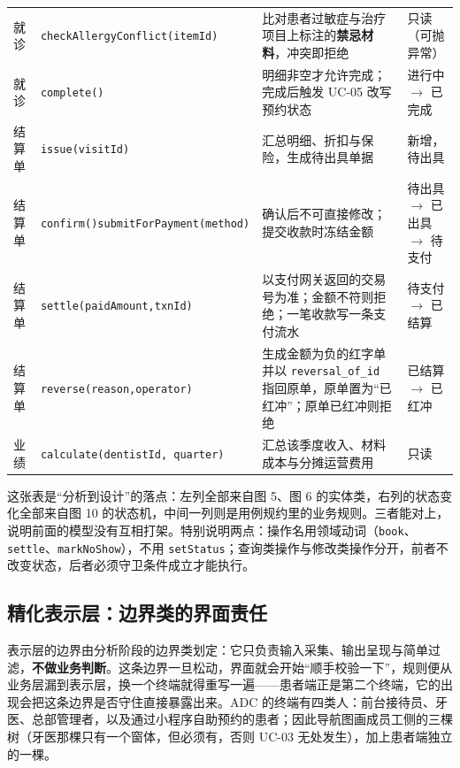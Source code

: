\documentclass[11pt,a4paper]{ctexart}
\begin{document}
\begin{longtable}{@{}L{2.0cm}L{4.2cm}L{4.2cm}L{3.8cm}@{}}
就诊 & \texttt{checkAllergyConflict}\newline \texttt{(itemId)} & 比对患者过敏症与治疗项目上标注的\textbf{禁忌材料}，冲突即拒绝 & 只读（可抛异常） \\
就诊 & \texttt{complete()} & 明细非空才允许完成；完成后触发 UC-05 改写预约状态 & 进行中 $\rightarrow$ 已完成 \\
结算单 & \texttt{issue(visitId)} & 汇总明细、折扣与保险，生成待出具单据 & 新增，待出具 \\
结算单 & \texttt{confirm()}\newline \texttt{submitForPayment}\newline \texttt{(method)} & 确认后不可直接修改；提交收款时冻结金额 & 待出具 $\rightarrow$ 已出具 $\rightarrow$ 待支付 \\
结算单 & \texttt{settle(paidAmount,}\newline \texttt{txnId)} & 以支付网关返回的交易号为准；金额不符则拒绝；一笔收款写一条支付流水 & 待支付 $\rightarrow$ 已结算 \\
结算单 & \texttt{reverse(reason,}\newline \texttt{operator)} & 生成金额为负的红字单并以 \texttt{reversal\_of\_id} 指回原单，原单置为“已红冲”；原单已红冲则拒绝 & 已结算 $\rightarrow$ 已红冲 \\
业绩 & \texttt{calculate}\newline \texttt{(dentistId, quarter)} & 汇总该季度收入、材料成本与分摊运营费用 & 只读 \\
\end{longtable}

这张表是“分析到设计”的落点：左列全部来自图 5、图 6 的实体类，右列的状态变化全部来自图 10 的状态机，中间一列则是用例规约里的业务规则。三者能对上，说明前面的模型没有互相打架。特别说明两点：操作名用领域动词（\texttt{book}、\texttt{settle}、\texttt{markNoShow}），不用 \texttt{setStatus}；查询类操作与修改类操作分开，前者不改变状态，后者必须守卫条件成立才能执行。

\subsection{精化表示层：边界类的界面责任}

表示层的边界由分析阶段的边界类划定：它只负责输入采集、输出呈现与简单过滤，\textbf{不做业务判断}。这条边界一旦松动，界面就会开始“顺手校验一下”，规则便从业务层漏到表示层，换一个终端就得重写一遍——患者端正是第二个终端，它的出现会把这条边界是否守住直接暴露出来。ADC 的终端有四类人：前台接待员、牙医、总部管理者，以及通过小程序自助预约的患者；因此导航图画成员工侧的三棵树（牙医那棵只有一个窗体，但必须有，否则 UC-03 无处发生），加上患者端独立的一棵。
\end{document}
